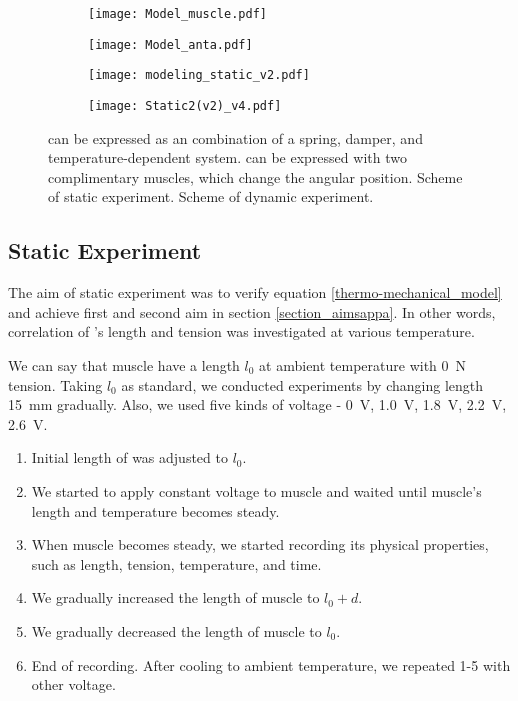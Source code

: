 \begin{figure}[t]
	\centering
	\begin{subfigure}[t]{0.2\textwidth}
		\centering\texttt{[image: Model\_muscle.pdf]}
		\caption{\label{ModelMus}}
	\end{subfigure}
	\begin{subfigure}[t]{0.25\textwidth}
		\centering\texttt{[image: Model\_anta.pdf]}
		\caption{\label{ModelAnt}}
	\end{subfigure}
	\begin{subfigure}[t]{0.18\textwidth}
		\centering\texttt{[image: modeling\_static\_v2.pdf]}
		\caption{\label{static_sch}}
	\end{subfigure}
	\begin{subfigure}[t]{0.18\textwidth}
		\centering\texttt{[image: Static2(v2)\_v4.pdf]} %
		\caption{\label{dynamic_sch}}
	\end{subfigure}
	\caption[Modeling of \scp]{ \scp can be expressed as an combination of a spring, damper, and temperature-dependent system.  \Anta can be expressed with two complimentary muscles, which change the angular position.  Scheme of static experiment.  Scheme of dynamic experiment.}
	\label{model+exp_sch}
\end{figure}

\subsection{Static Experiment}
The aim of static experiment was to verify equation \eqref{thermo-mechanical_model} and achieve first and second aim in section \ref{section_aimsappa}. In other words, correlation of \scpnospace's length and tension was investigated at various temperature. 

We can say that muscle have a length $l_{0}$ at ambient temperature with \SI{0}{\newton} tension. Taking $l_{0}$ as standard, we conducted experiments by changing length \SI{15}{\milli\meter} gradually. Also, we used five kinds of voltage - \SI{0}{\volt}, \SI{1.0}{\volt}, \SI{1.8}{\volt}, \SI{2.2}{\volt}, \SI{2.6}{\volt}.

\begin{enumerate}
\item Initial length of \scp was adjusted to $l_0$.
\item We started to apply constant voltage to muscle and waited until muscle's length and temperature becomes steady.
\item When muscle becomes steady, we started recording its physical properties, such as length, tension, temperature, and time.
\item We gradually increased the length of muscle to $l_0+d$.
\item We gradually decreased the length of muscle to $l_0$.
\item End of recording. After cooling to ambient temperature, we repeated 1-5 with other voltage.
\end{enumerate}

